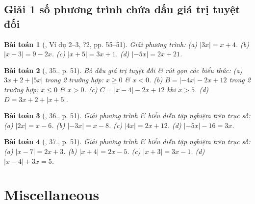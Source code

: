 \documentclass{article}
\newtheorem{baitoan}{Bài toán}
\begin{document}
\subsection{Giải 1 số phương trình chứa dấu giá trị tuyệt đối}

\begin{baitoan}[\cite{SGK_Toan_8_tap_2}, Ví dụ 2--3, ?2, pp. 55--51]
	Giải phương trình: (a) $|3x| = x + 4$. (b) $|x - 3| = 9 - 2x$. (c) $|x + 5| = 3x + 1$. (d) $|-5x| = 2x + 21$.
\end{baitoan}

\begin{baitoan}[\cite{SGK_Toan_8_tap_2}, 35., p. 51]
	Bỏ dấu giá trị tuyệt đối \& rút gọn các biểu thức: (a) $3x + 2 + |5x|$ trong 2 trường hợp: $x\ge0$ \& $x < 0$. (b) $B = |-4x| - 2x + 12$ trong 2 trường hợp: $x\le0$ \& $x > 0$. (c) $C = |x - 4| - 2x + 12$ khi $x > 5$. (d) $D = 3x + 2 + |x + 5|$.
\end{baitoan}

\begin{baitoan}[\cite{SGK_Toan_8_tap_2}, 36., p. 51]
	Giải phương trình \& biểu diễn tập nghiệm trên trục số: (a) $|2x| = x - 6$. (b) $|-3x| = x - 8$. (c) $|4x| = 2x + 12$. (d) $|-5x| - 16 = 3x$.
\end{baitoan}

\begin{baitoan}[\cite{SGK_Toan_8_tap_2}, 37., p. 51]
	Giải phương trình \& biểu diễn tập nghiệm trên trục số: (a) $|x - 7| = 2x + 3$. (b) $|x + 4| = 2x - 5$. (c) $|x + 3| = 3x - 1$. (d) $|x - 4| + 3x = 5$.
\end{baitoan}


\section{Miscellaneous}


\printbibliography[heading=bibintoc]
	
\end{document}

